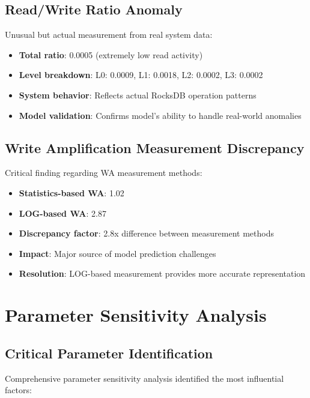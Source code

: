 \documentclass[11pt]{article}
\begin{document}
\subsection{Read/Write Ratio Anomaly}

Unusual but actual measurement from real system data:
\begin{itemize}
    \item \textbf{Total ratio}: 0.0005 (extremely low read activity)
    \item \textbf{Level breakdown}: L0: 0.0009, L1: 0.0018, L2: 0.0002, L3: 0.0002
    \item \textbf{System behavior}: Reflects actual RocksDB operation patterns
    \item \textbf{Model validation}: Confirms model's ability to handle real-world anomalies
\end{itemize}

\subsection{Write Amplification Measurement Discrepancy}

Critical finding regarding WA measurement methods:
\begin{itemize}
    \item \textbf{Statistics-based WA}: 1.02
    \item \textbf{LOG-based WA}: 2.87
    \item \textbf{Discrepancy factor}: 2.8x difference between measurement methods
    \item \textbf{Impact}: Major source of model prediction challenges
    \item \textbf{Resolution}: LOG-based measurement provides more accurate representation
\end{itemize}

\section{Parameter Sensitivity Analysis}

\subsection{Critical Parameter Identification}

Comprehensive parameter sensitivity analysis identified the most influential factors:
\end{document}
